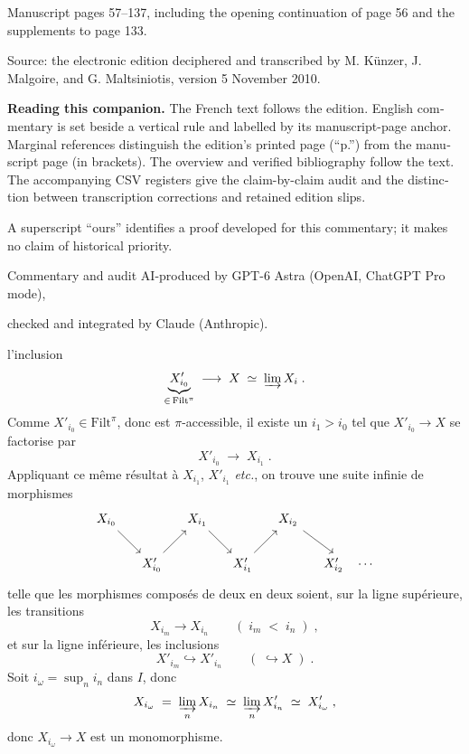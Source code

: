 \documentclass[11pt]{article}
\newcommand{\printedpage}[1]{\marginpar{\raggedright\footnotesize p.~#1}}
\newcommand{\Filt}{\mathrm{Filt}}
\begin{document}
\begin{otherlanguage}{english}
\thispagestyle{empty}
\vspace*{15mm}
\par\medskip
{}\par\medskip
{}\par\bigskip
{}\par
\vspace{18mm}
\noindent Manuscript pages 57--137, including the opening continuation
of page 56 and the supplements to page 133.\par\medskip
\noindent Source: the electronic edition deciphered and transcribed by
M. K\"unzer, J. Malgoire, and G. Maltsiniotis, version 5 November 2010.\par
\vspace{12mm}
\noindent\textbf{Reading this companion.}
The French text follows the edition. English commentary is set
beside a vertical rule and labelled by its manuscript-page anchor.
Marginal references distinguish the edition's printed page (``p.'')
from the manuscript page (in brackets). The overview and verified
bibliography follow the text. The accompanying CSV registers give the
claim-by-claim audit and the distinction between transcription corrections
and retained edition slips.\par\medskip
\noindent A superscript ``ours'' identifies a proof developed for this
commentary; it makes no claim of historical priority.\par
\vfill
\noindent Commentary and audit AI-produced by GPT-6 Astra (OpenAI, ChatGPT Pro mode),\par
\noindent checked and integrated by Claude (Anthropic).\par
\end{otherlanguage}
\clearpage
{}

\printedpage{34}
l'inclusion
\[
\underbrace{X'_{i_0}}_{\in\, \Filt^\pi} \;\longrightarrow\; X \;\simeq\; \varinjlim X_i \;.
\]
Comme $X'_{i_0} \in \Filt^\pi$, donc est $\pi$-accessible, il existe un $i_1 > i_0$ tel que $X'_{i_0} \longrightarrow X$ se factorise par
\[
X'_{i_0} \;\longrightarrow\; X_{i_1} \;.
\]
Appliquant ce même résultat à $X_{i_1}$, $X'_{i_1}$ \textit{etc.}, on trouve une suite infinie de morphismes
\[
\begin{tikzcd}[column sep=small]
X_{i_0} \arrow[dr] & & X_{i_1} \arrow[dr] & & X_{i_2} \arrow[dr] & \\
& X'_{i_0} \arrow[ur] & & X'_{i_1} \arrow[ur] & & X'_{i_2} \quad \cdots
\end{tikzcd}
\]
telle que les morphismes composés de deux en deux soient, sur la ligne supérieure, les transitions
\[
X_{i_m} \longrightarrow X_{i_n} \qquad (\; i_m \;<\; i_n \;) \;,
\]
et sur la ligne inférieure, les inclusions
\[
X'_{i_m} \hookrightarrow X'_{i_n} \qquad (\; \hookrightarrow X \;) \;.
\]
Soit $i_\omega = \sup_n i_n$ dans $I$, donc
\[
X_{i_\omega} \;=\; \varinjlim_{n} X_{i_n} \;\simeq\; \varinjlim_{n} X'_{i_n} \;\simeq\; X'_{i_\omega} \;,
\]
donc $X_{i_\omega} \longrightarrow X$ est un monomorphisme.
\end{document}
